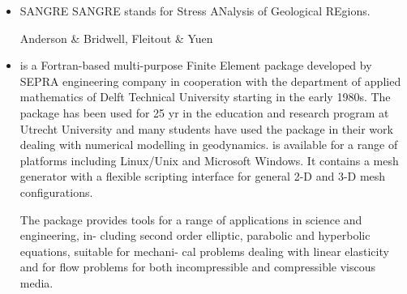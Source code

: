 \begin{itemize}
{\small
\noindent
\cite{egat10}
}


\item {\codefont SANGRE} 
SANGRE stands for Stress ANalysis of Geological REgions.

\begin{scriptsize}
Anderson \& Bridwell\cite{anbr80},
Fleitout \& Yuen \cite{flyu84,flyu84b}
\end{scriptsize}

\item \sepran 
{}

\sepran \cite{sepr05} is a Fortran-based
multi-purpose Finite Element package developed by SEPRA engineering company in
cooperation with the department of applied mathematics of Delft Technical University
starting in the early 1980s. The package has been used for 25 yr in the education and
research program at Utrecht University and many students have used the package in
their work dealing with numerical modelling in geodynamics. \sepran is available for
a range of platforms including Linux/Unix and Microsoft Windows. It contains a mesh
generator with a flexible scripting interface for general 2-D and 3-D mesh configurations.

The package provides tools for a range of applications in science and engineering, in-
cluding second order elliptic, parabolic and hyperbolic equations, suitable for mechani-
cal problems dealing with linear elasticity and for flow problems for both incompressible
and compressible viscous media.


\end{itemize}
